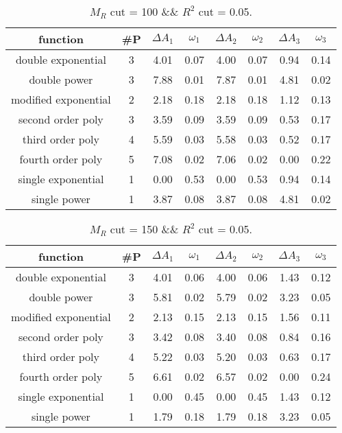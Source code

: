  
\begin{table}[H] 
\begin{center} 
\begin{tabular}{|c|c|cc|cc|cc|} 
\hline function & \#P & $\Delta A_1$ & $\omega_1$ & $\Delta A_2$ & $\omega_2$ & $\Delta A_3$ & $\omega_3$ \\ \hline 
double exponential &  3 &   4.01 &   0.07 &   4.00 &   0.07 &   0.94 &   0.14 \\ 
double power &  3 &   7.88 &   0.01 &   7.87 &   0.01 &   4.81 &   0.02 \\ 
modified exponential &  2 &   2.18 &   0.18 &   2.18 &   0.18 &   1.12 &   0.13 \\ 
second order poly &  3 &   3.59 &   0.09 &   3.59 &   0.09 &   0.53 &   0.17 \\ 
third order poly &  4 &   5.59 &   0.03 &   5.58 &   0.03 &   0.52 &   0.17 \\ 
fourth order poly &  5 &   7.08 &   0.02 &   7.06 &   0.02 &   0.00 &   0.22 \\ 
single exponential &  1 &   0.00 &   0.53 &   0.00 &   0.53 &   0.94 &   0.14 \\ 
single power &  1 &   3.87 &   0.08 &   3.87 &   0.08 &   4.81 &   0.02 \\ 
\hline 
\end{tabular} 
\caption{$M_R$ cut = 100 \&\& $R^2$ cut = 0.05.} 
\label{tab:FitChoices_100_0.05} 
\end{center} 
\end{table} 
 
 
\begin{table}[H] 
\begin{center} 
\begin{tabular}{|c|c|cc|cc|cc|} 
\hline function & \#P & $\Delta A_1$ & $\omega_1$ & $\Delta A_2$ & $\omega_2$ & $\Delta A_3$ & $\omega_3$ \\ \hline 
double exponential &  3 &   4.01 &   0.06 &   4.00 &   0.06 &   1.43 &   0.12 \\ 
double power &  3 &   5.81 &   0.02 &   5.79 &   0.02 &   3.23 &   0.05 \\ 
modified exponential &  2 &   2.13 &   0.15 &   2.13 &   0.15 &   1.56 &   0.11 \\ 
second order poly &  3 &   3.42 &   0.08 &   3.40 &   0.08 &   0.84 &   0.16 \\ 
third order poly &  4 &   5.22 &   0.03 &   5.20 &   0.03 &   0.63 &   0.17 \\ 
fourth order poly &  5 &   6.61 &   0.02 &   6.57 &   0.02 &   0.00 &   0.24 \\ 
single exponential &  1 &   0.00 &   0.45 &   0.00 &   0.45 &   1.43 &   0.12 \\ 
single power &  1 &   1.79 &   0.18 &   1.79 &   0.18 &   3.23 &   0.05 \\ 
\hline 
\end{tabular} 
\caption{$M_R$ cut = 150 \&\& $R^2$ cut = 0.05.} 
\label{tab:FitChoices_150_0.05} 
\end{center} 
\end{table} 
 

